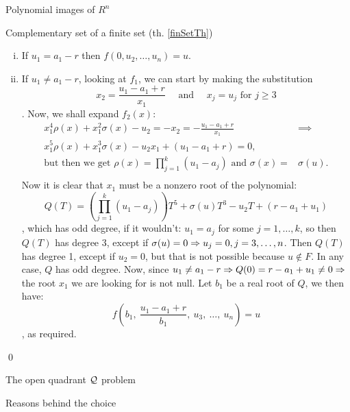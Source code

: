\documentclass[11pt, a4paper, english, twoside, notitlepage]{report}
\begin{document}
\begin{chapter}{Polynomial images of $R^n$}
\begin{section}{Complementary set of a finite set (th. \ref{finSetTh})}
\begin{Proof}
\begin{enumerate}[(i)]
			\item If $u_1=a_1-r$ then $f(0,u_2,\dots,u_n)=u$.
		
			\item If $u_1\neq a_1-r$, looking at $f_1$, we can start by making the substitution $$x_2=\frac{u_1 - a_1 + r}{x_1} \quad \text{ and } \quad x_j = u_j \text{ for } j\geq 3$$. Now, we shall expand $f_2(x)$:
			\begin{align*}
				x_1^4\rho(x) + x_1^2\sigma(x) - u_2 = - x_2 = - \frac{u_1 - a_1 + r}{x_1} & \implies \\
				x_1^5\rho(x) + x_1^3\sigma(x) - u_2 x_1 + (u_1 - a_1 + r) = 0, \\
				\text{but then we get } \rho(x) =  \prod_{j = 1}^k(u_1 - a_j) \text{ and } \sigma(x) = &\sigma(u). \\
			\end{align*}
			Now it is clear that $x_1$ must be a nonzero root of the polynomial:
			$$
			Q(T)=\left(\prod_{j=1}^k(u_1-a_j)\right)T^{5}+\sigma(u)T^{3}-u_2T+(r-a_1+u_1)
			$$
			, which has odd degree, if it wouldn't: $u_1= a_j$ for some $j = 1, \dots, k$, so then $Q(T)$ has degree 3, except if $\sigma(u) = 0 \Rightarrow u_j = 0, j = 3, \dots, n$. Then $Q(T)$ has degree 1, except if $u_2 = 0$, but that is not possible because $u\not\in F$. In any case, $Q$ has odd degree. Now, since $u_1\neq a_1 - r \Rightarrow Q(0) = r - a_1 + u_1 \neq 0 \Rightarrow$ the root $x_1$ we are looking for is not null. Let $b_1$ be a real root of $Q$, we then have:
			$$
			f\left(b_1,\ \frac{u_1-a_1+r}{b_1},\ u_3,\ \dots,\ u_n\right) = u
			$$
			, as required.
		\end{enumerate}
		\qed
	\end{Proof}
	
\end{section}

\begin{section}{The open quadrant $\mathcal{Q}$ problem}
	
	\begin{subsection}{Reasons behind the choice}\label{quadReasons}
		

\end{subsection}
\end{section}
\end{chapter}
\end{document}
